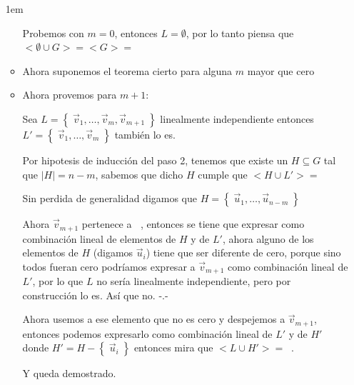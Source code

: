 \documentclass[12pt, fleqn]{report}                             %
\newenvironment{SmallIndentation}[1][0.75em]                    %
        {\begin{adjustwidth}{#1}{}\begin{footnotesize}}             %
        {\end{footnotesize}\end{adjustwidth}}                       %
\theoremstyle{break}                                            %
\DeclareMathOperator \GenericField {\mathbb{F}}                 %
\DeclareMathOperator \VectorSet    {\mathbb{V}}                 %
\DeclareMathOperator \VectorSpace  {\VectorSet_{\GenericField}} %
\newcommand{\Set}[1]            {\left\{ \; #1 \; \right\}}     %
\begin{document}
\begin{itemize}
\begin{SmallIndentation}[1em]
\begin{itemize}
                                    Probemos con $m = 0$, entonces $L = \emptyset$, por lo tanto piensa que
                                    $<\emptyset \cup G> = <G> = \VectorSpace$

                                \item
                                    Ahora suponemos el teorema cierto para alguna $m$ mayor que cero

                                \item
                                    Ahora provemos para $m+1$:

                                    Sea $L = \Set{\vec v_1, \dots, \vec v_m, \vec v_{m+1}}$ linealmente independiente
                                    entonces $L' = \Set{\vec v_1, \dots, \vec v_m}$ también lo es.

                                    Por hipotesis de inducción del paso 2, tenemos que existe un $H \subseteq G$
                                    tal que $|H| = n - m$, sabemos que dicho $H$ cumple que $<H \cup L'> = \VectorSpace$

                                    Sin perdida de generalidad digamos que $H = \Set{\vec u_1, \dots, \vec u_{n-m}}$

                                    Ahora $\vec v_{m+1}$ pertenece a $\VectorSpace$, entonces se tiene que expresar
                                    como combinación lineal de elementos de $H$ y de $L'$, ahora alguno de los
                                    elementos de $H$ (digamos $\vec u_i$) tiene que ser diferente de cero, porque
                                    sino todos fueran cero
                                    podríamos expresar a $\vec v_{m+1}$ como combinación lineal de $L'$, por lo que 
                                    $L$ no sería linealmente independiente, pero por construcción lo es.
                                    Así que no. -.-

                                    Ahora usemos a ese elemento que no es cero y despejemos a $\vec v_{m+1}$, entonces
                                    podemos expresarlo como combinación lineal de $L'$ y de $H'$ donde
                                    $H' = H - \Set{\vec u_i}$ entonces mira que $<L \cup H'> = \VectorSpace$.

                                    Y queda demostrado.
                            \end{itemize}
                        

\end{SmallIndentation}
\end{itemize}
\end{document}
